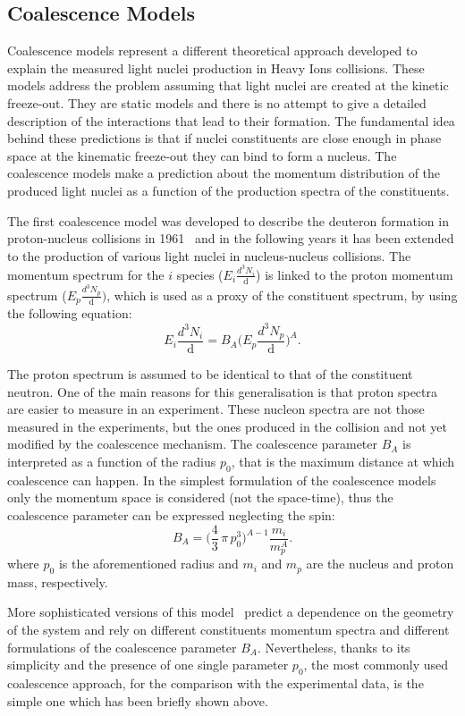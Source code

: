 %
\subsection{Coalescence Models} \label{sec:1.4.2}

Coalescence models represent a different theoretical approach developed to explain 
the measured light nuclei production in Heavy Ions collisions. 
These models address the problem assuming that light nuclei are created at the kinetic freeze-out. 
They are static models and there is no attempt to give a detailed description of the 
interactions that lead to their formation.
The fundamental idea behind these predictions is that if nuclei constituents are close enough in 
phase space at the kinematic freeze-out they can bind to form a nucleus. 
The coalescence models make a prediction about the momentum distribution of the produced light 
nuclei as a function of the production spectra of the constituents.

The first coalescence model was developed to describe the deuteron formation in
proton-nucleus collisions in 1961~\cite{coalefirst} and in the following years it has been extended to 
the production of various light nuclei in nucleus-nucleus collisions.
The momentum spectrum for the $i$ species ($E_{i} \frac{d^{3}N_{i}}{\mathop{dp_{i}^{3}}}$) is linked to 
the proton momentum spectrum ($E_{p} \frac{d^{3}N_{p}}{\mathop{dp_{p}^{3}}})$, which is used as a 
proxy of the constituent spectrum, by using the following equation:
\begin{equation}
    E_{i} \frac{d^{3}N_{i}}{\mathop{dp_{i}^{3}}} = B_{A} \Big( E_{p} \frac{d^{3}N_{p}}{\mathop{dp_{p}^{3}}} \Big)^{A}.
\end{equation}

The proton spectrum  is assumed to be identical to that of the constituent neutron.
One of the main reasons for this generalisation is that proton spectra are easier to measure
in an experiment.
These nucleon spectra are not those measured in the experiments, but the ones produced in the 
collision and not yet modified by the coalescence mechanism.
The coalescence parameter $B_{A}$ is interpreted as a function of the radius $p_{0}$, that 
is the maximum distance at which coalescence can happen.
In the simplest formulation of the coalescence models only the momentum space is considered
(not the space-time), thus the coalescence parameter can be expressed neglecting the spin:
\begin{equation} 
    B_{A} = \Big( \frac{4}{3}\, \pi \,p_{0}^3 \Big)^{A-1} \frac{m_{i}}{m_{p}^{A}}.
\end{equation}
where $p_{0}$ is the aforementioned radius and $m_{i}$ and $m_{p}$ are the nucleus and proton
mass, respectively.

More sophisticated versions of this model~\cite{deuprod} predict a dependence on the geometry of the
system and rely on different constituents momentum spectra and different formulations of 
the coalescence parameter $B_{A}$. Nevertheless, thanks to its simplicity and the presence
of one single parameter $p_{0}$, the most commonly used coalescence approach, for the comparison with
the experimental data, is the simple one which has been briefly shown above.
